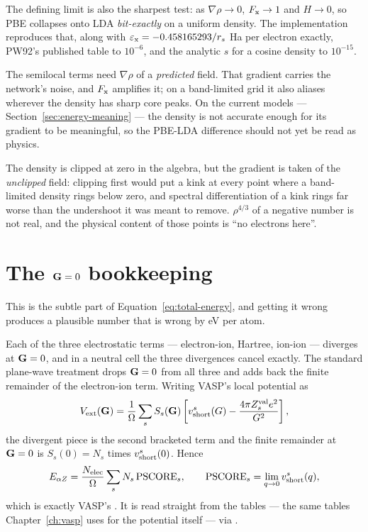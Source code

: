 The defining limit is also the sharpest test: as $\nabla\rho \to 0$,
$F_{\rm x} \to 1$ and $H \to 0$, so PBE collapses onto LDA \emph{bit-exactly}
on a uniform density. The implementation reproduces that, along with
$\varepsilon_{\rm x} = -0.458165293/r_s$ Ha per electron exactly, PW92's
published table to $10^{-6}$, and the analytic $s$ for a cosine density to
$10^{-15}$.

\begin{pwarn}
The semilocal terms need $\nabla\rho$ of a \emph{predicted} field. That
gradient carries the network's noise, and $F_{\rm x}$ amplifies it; on a
band-limited grid it also aliases wherever the density has sharp core peaks.
On the current models --- Section~\ref{sec:energy-meaning} --- the density is
not accurate enough for its gradient to be meaningful, so the PBE-LDA
difference should not yet be read as physics.
\end{pwarn}

The density is clipped at zero in the algebra, but the gradient is taken of the
\emph{unclipped} field: clipping first would put a kink at every point where a
band-limited density rings below zero, and spectral differentiation of a kink
rings far worse than the undershoot it was meant to remove. $\rho^{4/3}$ of a
negative number is not real, and the physical content of those points is ``no
electrons here''.

\section{The \texorpdfstring{$\mathbf{G} = 0$}{G = 0} bookkeeping}

This is the subtle part of Equation~\ref{eq:total-energy}, and getting it
wrong produces a plausible number that is wrong by eV per atom.

Each of the three electrostatic terms --- electron-ion, Hartree, ion-ion ---
diverges at $\mathbf{G} = 0$, and in a neutral cell the three divergences cancel
exactly. The standard plane-wave treatment drops $\mathbf{G} = 0$ from all three and
adds back the finite remainder of the electron-ion term. Writing VASP's local
potential as
\begin{equation}
  V_{\mathrm{ext}}(\mathbf{G}) = \frac{1}{\Omega}\sum_s S_s(\mathbf{G})
    \left[v^{s}_{\rm short}(G) - \frac{4\pi Z^{\rm val}_s e^2}{G^2}\right],
\end{equation}
the divergent piece is the second bracketed term and the finite remainder at
$\mathbf{G} = 0$ is $S_s(0) = N_s$ times $v^{s}_{\rm short}(0)$. Hence
\begin{equation}
  E_{\alpha Z} = \frac{N_{\rm elec}}{\Omega}\sum_s N_s\,\mathrm{PSCORE}_s,
  \qquad \mathrm{PSCORE}_s = \lim_{q\to0}v^{s}_{\rm short}(q),
\end{equation}
which is exactly VASP's . It is read straight from the
 tables --- the same tables Chapter~\ref{ch:vasp} uses for the
potential itself --- via
.

